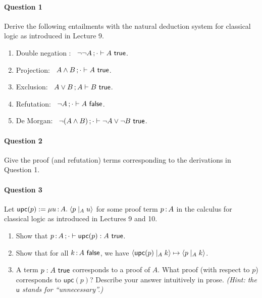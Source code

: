 \documentclass[11pt,a4paper,twoside]{article}
\begin{document}
\paragraph{Question 1} Derive the following entailments with the natural deduction system for classical logic as introduced in Lecture 9.

\begin{enumerate}[label=(\alph*)]
  \item Double negation : \ $\neg\neg A \, ; \cdot \vdash A\ \mathsf{true}$.

  \item Projection: \ $A \land B \, ; \cdot \vdash A\ \mathsf{true}$.

  \item Exclusion: \ $A \lor B \, ; A \vdash B\ \mathsf{true} $.

  \item Refutation: \ $\neg A \, ; \cdot \vdash A\ \mathsf{false}$.

  \item De Morgan: \ $\neg(A \land B) \, ; \cdot \vdash \neg A \lor \neg B\ \mathsf{true}$.
\end{enumerate}

\paragraph{Question 2} Give the proof (and refutation) terms corresponding to the derivations in Question 1.

\paragraph{Question 3} Let $\mathsf{upc}(p) := \mu u \,{:}\, A .\; \langle p \mid_{A} u \rangle$ for some proof term $p \,{:}\, A$ in the calculus for classical logic as introduced in Lectures 9 and 10.

\begin{enumerate}[label=(\alph*)]
  \item Show that $p \,{:}\, A \, ; \cdot \vdash \mathsf{upc}(p) : A\ \mathsf{true}$.

  \item Show that for all $\var{k}{A\ \false}$, we have $\langle \mathsf{upc}(p) \mid_{A} k \rangle \mapsto \langle p \mid_{A} k \rangle$.

  \item A term $p : A\ \mathsf{true}$ corresponds to a proof of $A$. 
    What proof (with respect to $p$) corresponds to $\mathsf{upc}(p)$?
    Describe your answer intuitively in prose.
    \emph{(Hint: the $\mathsf{u}$ stands for ``unnecessary''.)}
\end{enumerate}
\end{document}

